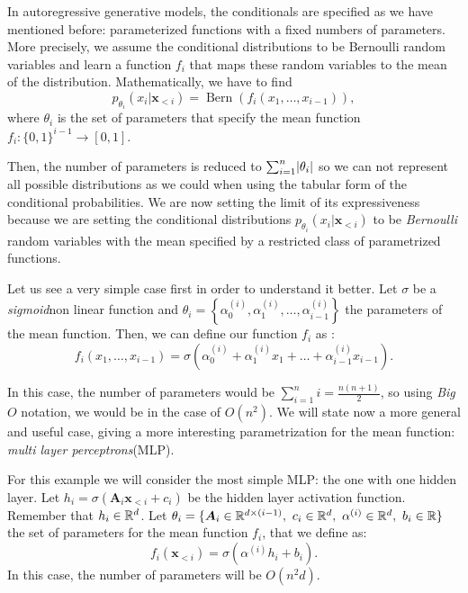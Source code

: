 In autoregressive generative models, the conditionals are specified as we have mentioned before: parameterized functions with a fixed numbers of parameters. More precisely,  we assume 
the conditional distributions to be Bernoulli random variables and learn a function $f_i$ that maps these random variables to the mean of the distribution. Mathematically, we have to find 
$$
p_{\theta_i}(x_i | \bm{x}_{<i}) = \operatorname{Bern}(f_i(x_1,\dots,x_{i-1})),
$$
where $\theta_i$ is the set of parameters that specify the mean function $f_i:\{0,1\}^{i-1} \to [0,1]$.

Then, the number of parameters is reduced to $\sum_{i=1}^n \lvert\theta_i\rvert$ so we can not represent all possible distributions as we could when using the tabular form of the conditional probabilities.
We are now setting the limit of its expressiveness because we are setting the conditional distributions $p_{\theta_i}(x_i|\bm{x}_{<i})$ to be \emph{Bernoulli} random variables with the mean specified by a restricted class 
of parametrized functions. 

Let us see a very simple case first in order to understand it better. Let $\sigma$ be a \emph{sigmoid}\footnotemark non linear function and 
$\theta_i = \left\{\alpha_{0}^{(i)},\alpha_{1}^{(i)},\dots, \alpha_{i-1}^{(i)}\right\}$ the parameters of the mean function. Then, we can define our function $f_i$ as :
$$
f_i(x_1,\dots, x_{i-1}) = \sigma(\alpha_{0}^{(i)} + \alpha_{1}^{(i)}x_1 + \dots + \alpha_{i-1}^{(i)}x_{i-1}).
$$

In this case, the number of parameters would be $\sum_{i = 1}^n i = \frac{n(n+1)}{2}$, so using \emph{Big }$O$ notation, we would be in the case of $O(n^2)$. We will state now a more general and useful case,
giving a more interesting parametrization for the mean function: \emph{multi layer perceptrons}\footnotemark (MLP).


For this example we will consider the most simple MLP: the one with one hidden layer. Let $h_i = \sigma(\bm{A}_i \bm{x}_{<i} + c_i)$ be the hidden layer activation function. Remember that $h_i \in \mathbb{R}^d$. Let
$ \theta_i = \{ \bm{A}_i \in \R^{d \times (i-1)}, \ c_i \in \R^d, \ \alpha^{(i)} \in \R^d, \ b_i \in \R\}$ the set of parameters
for the mean function $f_i$, that we define as:
$$
f_i(\bm{x}_{<i}) = \sigma(\alpha^{(i)}h_i + b_i).
$$
In this case, the number of parameters will be $O(n^2 d)$.

